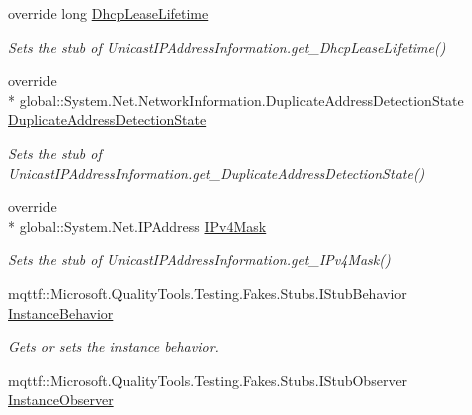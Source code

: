 \begin{DoxyCompactItemize}
override long \hyperlink{class_system_1_1_net_1_1_network_information_1_1_fakes_1_1_stub_unicast_i_p_address_information_ad276ae55afa44efdb5f5fc9587b512ae}{Dhcp\-Lease\-Lifetime}
\begin{DoxyCompactList}\small\item\em Sets the stub of Unicast\-I\-P\-Address\-Information.\-get\-\_\-\-Dhcp\-Lease\-Lifetime()\end{DoxyCompactList}\item 
override \\*
global\-::\-System.\-Net.\-Network\-Information.\-Duplicate\-Address\-Detection\-State \hyperlink{class_system_1_1_net_1_1_network_information_1_1_fakes_1_1_stub_unicast_i_p_address_information_a70b8fcc12e567d65352eec7e11af28d1}{Duplicate\-Address\-Detection\-State}
\begin{DoxyCompactList}\small\item\em Sets the stub of Unicast\-I\-P\-Address\-Information.\-get\-\_\-\-Duplicate\-Address\-Detection\-State()\end{DoxyCompactList}\item 
override \\*
global\-::\-System.\-Net.\-I\-P\-Address \hyperlink{class_system_1_1_net_1_1_network_information_1_1_fakes_1_1_stub_unicast_i_p_address_information_a23829f41a16594287f017f4e6b52e3a6}{I\-Pv4\-Mask}
\begin{DoxyCompactList}\small\item\em Sets the stub of Unicast\-I\-P\-Address\-Information.\-get\-\_\-\-I\-Pv4\-Mask()\end{DoxyCompactList}\item 
mqttf\-::\-Microsoft.\-Quality\-Tools.\-Testing.\-Fakes.\-Stubs.\-I\-Stub\-Behavior \hyperlink{class_system_1_1_net_1_1_network_information_1_1_fakes_1_1_stub_unicast_i_p_address_information_a39e1455bc0ffc9654a4a4402ff6a85f3}{Instance\-Behavior}
\begin{DoxyCompactList}\small\item\em Gets or sets the instance behavior.\end{DoxyCompactList}\item 
mqttf\-::\-Microsoft.\-Quality\-Tools.\-Testing.\-Fakes.\-Stubs.\-I\-Stub\-Observer \hyperlink{class_system_1_1_net_1_1_network_information_1_1_fakes_1_1_stub_unicast_i_p_address_information_aa1caa399954b51b499aff99c8e3047e2}{Instance\-Observer}

\end{DoxyCompactItemize}
